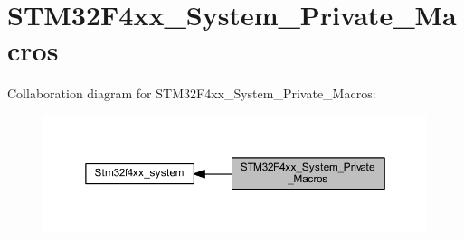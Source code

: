 \hypertarget{group___s_t_m32_f4xx___system___private___macros}{}\section{S\+T\+M32\+F4xx\+\_\+\+System\+\_\+\+Private\+\_\+\+Macros}
\label{group___s_t_m32_f4xx___system___private___macros}
Collaboration diagram for S\+T\+M32\+F4xx\+\_\+\+System\+\_\+\+Private\+\_\+\+Macros\+:
\nopagebreak
\begin{figure}[H]
\begin{center}
\leavevmode
\includegraphics[width=350pt]{group___s_t_m32_f4xx___system___private___macros}
\end{center}
\end{figure}
